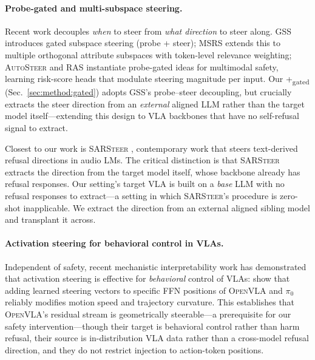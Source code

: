 \paragraph{Probe-gated and multi-subspace steering.}
Recent work decouples \emph{when} to steer from \emph{what direction} to steer along. \textsc{GSS} \citep{gss2026} introduces gated subspace steering (probe + steer); \textsc{MSRS} \citep{msrs2025} extends this to multiple orthogonal attribute subspaces with token-level relevance weighting; \textsc{AutoSteer} \citep{autosteer2025} and \textsc{RAS} \citep{ras2025} instantiate probe-gated ideas for multimodal safety, learning risk-score heads that modulate steering magnitude per input. Our \method{}+\textsubscript{gated} (Sec.~\ref{sec:method:gated}) adopts GSS's probe--steer decoupling, but crucially extracts the steer direction from an \emph{external} aligned LLM rather than the target model itself---extending this design to VLA backbones that have no self-refusal signal to extract.

Closest to our work is \textsc{SARSteer} \citep{sarsteer2025}, contemporary work that steers text-derived refusal directions in audio LMs. The critical distinction is that \textsc{SARSteer} extracts the direction from the target model itself, whose backbone already has refusal responses. Our setting's target VLA is built on a \emph{base} LLM with no refusal responses to extract---a setting in which \textsc{SARSteer}'s procedure is zero-shot inapplicable. We extract the direction from an external aligned sibling model and transplant it across.

\paragraph{Activation steering for behavioral control in VLAs.}
Independent of safety, recent mechanistic interpretability work has demonstrated that activation steering is effective for \emph{behavioral} control of VLAs: \citet{mechinterpvla2025} show that adding learned steering vectors to specific FFN positions of \textsc{OpenVLA} and \textsc{$\pi_0$} reliably modifies motion speed and trajectory curvature. This establishes that \textsc{OpenVLA}'s residual stream is geometrically steerable---a prerequisite for our safety intervention---though their target is behavioral control rather than harm refusal, their source is in-distribution VLA data rather than a cross-model refusal direction, and they do not restrict injection to action-token positions.

